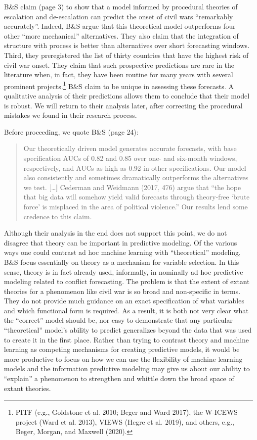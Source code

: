 \documentclass[
]{article}
\begin{document}
B\&S claim (page 3) to show that a model informed by procedural theories of escalation and de-escalation can predict the onset of civil wars ``remarkably accurately''. Indeed, B\&S argue that this theoretical model outperforms four other ``more mechanical'' alternatives. They also claim that the integration of structure with process is better than alternatives over short forecasting windows. Third, they preregistered the list of thirty countries that have the highest risk of civil war onset. They claim that such prospective predictions are rare in the literature when, in fact, they have been routine for many years with several prominent projects.\footnote{PITF (e.g., Goldstone et al. 2010; Beger and Ward 2017), the W-ICEWS project (Ward et al. 2013), VIEWS (Hegre et al. 2019), and others, e.g., Beger, Morgan, and Maxwell (2020).} B\&S claim to be unique in assessing these forecasts. A qualitative analysis of their predictions allows them to conclude that their model is robust. We will return to their analysis later, after correcting the procedural mistakes we found in their research process.

Before proceeding, we quote B\&S (page 24):

\begin{quote}
Our theoretically driven model generates accurate forecasts, with base specification AUCs of 0.82 and 0.85 over one- and six-month windows, respectively, and AUCs as high as 0.92 in other specifications. Our model also consistently and sometimes dramatically outperforms the alternatives we test. {[}\ldots{]} Cederman and Weidmann (2017, 476) argue that ``the hope that big data will somehow yield valid forecasts through theory-free `brute force' is misplaced in the area of political violence.'' Our results lend some credence to this claim.
\end{quote}

Although their analysis in the end does not support this point, we do not disagree that theory can be important in predictive modeling. Of the various ways one could contrast ad hoc machine learning with ``theoretical'' modeling, B\&S focus essentially on theory as a mechanism for variable selection. In this sense, theory is in fact already used, informally, in nominally ad hoc predictive modeling related to conflict forecasting. The problem is that the extent of extant theories for a phenomenon like civil war is so broad and non-specific in terms. They do not provide much guidance on an exact specification of what variables and which functional form is required. As a result, it is both not very clear what the ``correct'' model should be, nor easy to demonstrate that any particular ``theoretical'' model's ability to predict generalizes beyond the data that was used to create it in the first place. Rather than trying to contrast theory and machine learning as competing mechanisms for creating predictive models, it would be more productive to focus on how we can use the flexibility of machine learning models and the information predictive modeling may give us about our ability to ``explain'' a phenomenon to strengthen and whittle down the broad space of extant theories.
\end{document}
